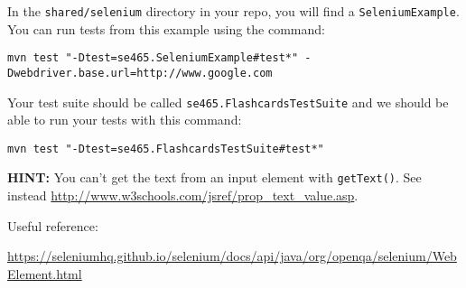 \documentclass[10pt,hidelinks]{article}
\begin{document}
In the {\tt shared/selenium} directory in your repo, you will find a {\tt SeleniumExample}.
You can run tests from this example using the command:

\begin{verbatim}
mvn test "-Dtest=se465.SeleniumExample#test*" -Dwebdriver.base.url=http://www.google.com
\end{verbatim}

Your test suite should be called {\tt se465.FlashcardsTestSuite} and we should be able to run your tests with this command:

\begin{verbatim}
mvn test "-Dtest=se465.FlashcardsTestSuite#test*"
\end{verbatim}

{\bf HINT:} You can't get the text from an input element with {\tt getText()}. See instead
\url{http://www.w3schools.com/jsref/prop_text_value.asp}.

Useful reference:

\url{https://seleniumhq.github.io/selenium/docs/api/java/org/openqa/selenium/WebElement.html}
\end{document}
